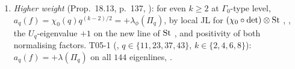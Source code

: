 \begin{outline}
\begin{enumerate}[label=(\arabic*)]
  So $\theta'=\theta$, $\delta=+1$, then $e=+1$ by (c). The hybrid dictionary commutes with $\pi_*$ and is excluded only modulo cited
  results (JL, strong multiplicity one, and Casselman's local newform theory, not checked) at levels carrying a $q$-new form new at $p^s$
  with $a_p\notin\R$, an existence condition not verified in general.
\item \emph{Higher weight} (Prop.~18.13, p.~137, \stpmc): for even $k\ge2$ at $\Gamma_0$-type level, $a_q(f)=\chi_0(q)q^{(k-2)/2}=+\lambda_\phi(\Pi_q)$,
  by local JL for $(\chi_0\circ\det)\otimes\mathrm{St}$ \cite[Ch.~III, Thm.~15.1]{JL}, \cite[Thm.~1.1, Cor.~3.25]{Taibi22}, the $U_q$-eigenvalue $+1$ on
  the new line of $\mathrm{St}$ \cite[Prop.~2.2]{Hs}, and positivity of both normalising factors. T05-1 (, $q\in\{11,23,37,43\}$,
  $k\in\{2,4,6,8\}$): $a_q(f)=+\lambda(\Pi_q)$ on all $144$ eigenlines, \stcomp.
\end{enumerate}
\end{outline}

